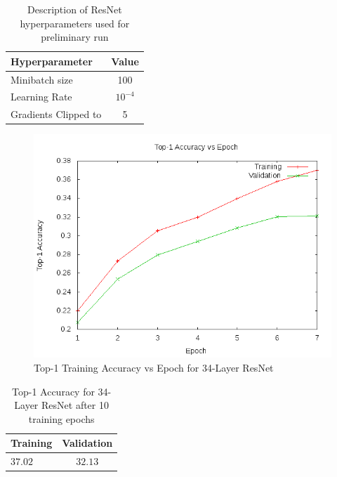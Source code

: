 \documentclass[10pt,twocolumn,letterpaper]{article}
\begin{document}
\begin{table}
\begin{center}
\begin{tabular}{|l|c|}
\hline
Hyperparameter & Value \\
\hline\hline
Minibatch size & 100 \\
Learning Rate & $10^{-4}$\\
Gradients Clipped to & 5\\
\hline
\end{tabular}
\end{center}
\caption{Description of ResNet hyperparameters used for preliminary run}
\label{table:hyper}
\end{table}

\begin{figure}[t]
\begin{center}
  \includegraphics[width=0.8\linewidth]{accuracy_resnet34}
\end{center}
   \caption{Top-1 Training Accuracy vs Epoch for 34-Layer ResNet}
\label{fig:top1-resnet34}
\end{figure}

\begin{table}
\begin{center}
\begin{tabular}{|l|c|}
\hline
Training & Validation \\
\hline\hline
$37.02$ & $32.13$\\
\hline
\end{tabular}
\end{center}
\caption{Top-1 Accuracy for 34-Layer ResNet after 10 training epochs}
\label{table:acc}
\end{table}


\nocite{Lin}
\nocite{Wu}


{\small


}
\end{document}
